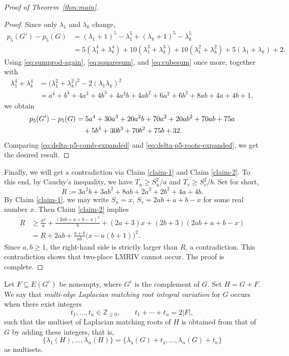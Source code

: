 \documentclass[11pt]{amsart}
\numberwithin{equation}{section}
\begin{document}
\begin{proof}[Proof of Theorem~\ref{thm:main}]
\begin{proof}
Since only $\lambda_1$ and $\lambda_k$ change,
\begin{align*}
p_5(G')-p_5(G)
& =(\lambda_1+1)^5-\lambda_1^5+(\lambda_k+1)^5-\lambda_k^5\\
& =5(\lambda_1^4+\lambda_k^4)+10(\lambda_1^3+\lambda_k^3)
+10(\lambda_1^2+\lambda_k^2)+5(\lambda_1+\lambda_k)+2.
\end{align*}
Using \eqref{eq:sumprod-again}, \eqref{eq:squaresum}, and \eqref{eq:cubesum} once more, together with
\begin{align*}
\lambda_1^4+\lambda_k^4
& =\bigl(\lambda_1^2+\lambda_k^2\bigr)^2-2(\lambda_1\lambda_k)^2 \\
& =a^4+b^4+4a^3+4b^3+4a^2b+4ab^2+6a^2+6b^2+8ab+4a+4b+1,
\end{align*}
we obtain
\begin{align}
p_5(G')-p_5(G)
& = 5a^4+30a^3+20a^2b+70a^2+20ab^2+70ab+75a \notag\\
& \quad+5b^4+30b^3+70b^2+75b+32.
\label{eq:delta-p5-roots-expanded}
\end{align}
Comparing \eqref{eq:delta-p5-comb-expanded} and \eqref{eq:delta-p5-roots-expanded}, we get the desired result.
\end{proof}

Finally, we will get a contradiction via Claim \ref{claim-1} and Claim \ref{claim-2}. To this end, by Cauchy's inequality, we have
$T_u\geq S_u^2/a$ and $T_v\geq S_v^2/b$.
Set for short, 
\[
R:=3a^2b+3ab^2+8ab+2a^2+2b^2+4a+4b.
\]
By Claim \ref{claim-1}, we may write $S_u=x$, $S_v=2ab+a+b-x$
for some real number $x$. Then Claim \ref{claim-2} implies
\begin{align*}
R
&\ge \frac{x^2}{a}+\frac{(2ab+a+b-x)^2}{b}+(2a+3)x+(2b+3)(2ab+a+b-x)\\
&=R+2ab+\frac{a+b}{ab}\bigl(x-a(b+1)\bigr)^2.
\end{align*}
Since $a,b\ge 1$, the right-hand side is strictly larger than $R$, a contradiction.
This contradiction shows that two-place LMRIV cannot occur. The proof is complete.
\end{proof}


Let $F\subseteq E(G^c)$ be nonempty, where $G^c$ is the complement of $G$. Set $H=G+F$. 
We say that \emph{multi-edge Laplacian matching root integral variation} for $G$ occurs when there exist integers
\[
t_1,\dots,t_n\in \mathbb Z_{\ge 0},\qquad t_1+\cdots+t_n=2|F|,
\]
such that the multiset of Laplacian matching roots of $H$ is obtained from that of $G$ by adding these integers, that is,
\[
\{\lambda_1(H),\dots,\lambda_n(H)\}
=
\{\lambda_1(G)+t_1,\dots,\lambda_n(G)+t_n\}
\]
as multisets.
\end{document}
